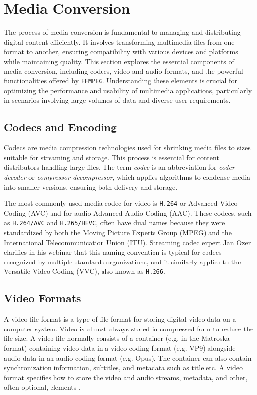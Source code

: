 \section{Media Conversion}

The process of media conversion is fundamental to managing and distributing digital content efficiently. It involves transforming multimedia files from one format to another, ensuring compatibility with various devices and platforms while maintaining quality. This section explores the essential components of media conversion, including codecs, video and audio formats, and the powerful functionalities offered by \texttt{FFMPEG}. Understanding these elements is crucial for optimizing the performance and usability of multimedia applications, particularly in scenarios involving large volumes of data and diverse user requirements.

\subsection{Codecs and Encoding}
Codecs are media compression technologies used for shrinking media files to sizes suitable for streaming and storage. This process is essential for content distributors handling large files. The term \textit{codec} is an abbreviation for \textit{coder-decoder} or \textit{compressor-decompressor}, which applies algorithms to condense media into smaller versions, ensuring both delivery and storage.

The most commonly used media codec for video is \texttt{H.264} or Advanced Video Coding (AVC) and for audio Advanced Audio Coding (AAC). These codecs, such as \texttt{H.264/AVC} and \texttt{H.265/HEVC}, often have dual names because they were standardized by both the Moving Picture Experts Group (MPEG) and the International Telecommunication Union (ITU). Streaming codec expert Jan Ozer clarifies in his webinar \cite{Ozer2021VideoCodecs} that this naming convention is typical for codecs recognized by multiple standards organizations, and it similarly applies to the Versatile Video Coding (VVC), also known as \texttt{H.266}.

\subsection{Video Formats}
A video file format is a type of file format for storing digital video data on a computer system. Video is almost always stored in compressed form to reduce the file size. A video file normally consists of a container (e.g. in the Matroska format) containing video data in a video coding format (e.g. VP9) alongside audio data in an audio coding format (e.g. Opus). The container can also contain synchronization information, subtitles, and metadata such as title etc. A video format specifies how to store the video and audio streams, metadata, and other, often optional, elements \cite{WikiVideoFormat}.

